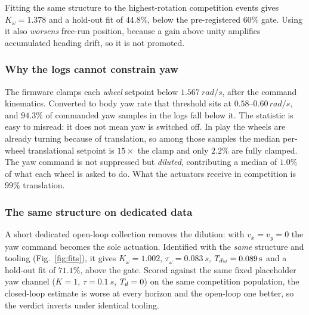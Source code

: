 Fitting the same structure to the highest-rotation competition events gives
$K_\omega = 1.378$ and a hold-out fit of $44.8\%$, below the pre-registered
$60\%$ gate. Using it also \emph{worsens} free-run position, because a gain
above unity amplifies accumulated heading drift, so it is not promoted.

\subsubsection{Why the logs cannot constrain yaw}
The firmware clamps each \emph{wheel} setpoint below $\SI{1.567}{rad/s}$, after
the command kinematics. Converted to body yaw rate that threshold sits at
$0.58$--$0.60\,\si{rad/s}$, and $94.3\%$ of commanded yaw samples in the logs
fall below it. The statistic is easy to misread: it does not mean yaw is
switched off. In play the wheels are already turning because of translation, so
among those samples the median per-wheel translational setpoint is $15\times$
the clamp and only $2.2\%$ are fully clamped. The yaw command is not suppressed
but \emph{diluted}, contributing a median of $1.0\%$ of what each wheel is asked
to do. What the actuators receive in competition is $99\%$ translation.

\subsubsection{The same structure on dedicated data}
A short dedicated open-loop collection removes the dilution: with
$v_x = v_y = 0$ the yaw command becomes the sole actuation. Identified with the
\emph{same} structure and tooling (Fig.~\ref{fig:fits}), it gives
$K_\omega = 1.002$, $\tau_\omega = \SI{0.083}{s}$, $T_{d}{}_\omega = \SI{0.089}{s}$
and a hold-out fit of $71.1\%$, above the gate. Scored against the same fixed
placeholder yaw channel ($K=1$, $\tau=\SI{0.1}{s}$, $T_{d}=0$) on the same competition population, the closed-loop estimate is
worse at every horizon and the open-loop one better, so the verdict inverts
under identical tooling.